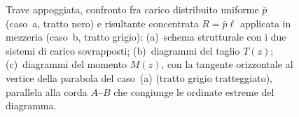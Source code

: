 \begin{figure}[htbp]
{
			}
			\caption{Trave appoggiata, confronto fra carico distribuito uniforme
				$\bar{p}$ (caso~a, tratto nero) e risultante concentrata
				$R = \bar{p}\ell$ applicata in mezzeria (caso~b, tratto grigio):
				(a)~schema strutturale con i due sistemi di carico sovrapposti;
				(b)~diagrammi del taglio $T(z)$; (c)~diagrammi del momento $M(z)$,
				con la tangente orizzontale al vertice della parabola del caso~(a)
				(tratto grigio tratteggiato), parallela alla corda $A$--$B$ che
				congiunge le ordinate estreme del diagramma.}
			\label{fig:stat_confronto_01}
		\end{figure}
